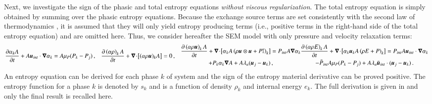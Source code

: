 \documentclass[preprint,10pt]{elsarticle}
\begin{document}
Next, we investigate the sign of the phasic and total entropy equations \emph{without viscous regularization}. The total entropy equation is simply 
obtained by summing over the phasic entropy equations. Because the exchange source terms are set consistently with the second 
law of thermodynamics \cite{BaerNunziato, PassmanNunziato}, it is assumed that they will only yield entropy producing terms (i.e., positive 
terms in the right-hand side of the total entropy equation) and are omitted here. Thus, we consider hereafter the SEM model with only 
pressure and velocity relaxation terms:
\begin{subequations}\label{eq:liq-7-eqn-sect5_no_exchange}
\begin{align}
  \label{eqn:multi-d-7-eqn-liq-vol_no_exchange}
  \frac{\partial \alpha_{k} A}{\partial t} + A\mbold u_{int} \cdot \grad \alpha_{k}
  &= A \mu_P (P_{k} - P_{j}) \,,
\end{align}
\begin{align}
  \label{multi-d-7-equ-liq_no_exchange}
  \frac{\partial \left( \alpha \rho \right)_{k} A}{\partial t}
  + \div \left[ (\alpha \rho \mbold u)_{k} A \right]
  &= 0 \,,
\end{align}
\begin{multline}
  \frac{\partial \left( \alpha \rho \mbold u \right)_{k} A}{\partial t}
  + \div \left[ \alpha_{k} A \left( \rho \mbold u \otimes \mbold u + P \mathbb{I} \right)_{k} \right]
  = P_{int} A \grad \alpha_{k} \\ + P_{k} \alpha_{k} \grad A
  + A \lambda_u (\mbold u_{j} - \mbold u_{k})\,,
\end{multline}
\begin{multline}
  \frac{\partial \left( \alpha \rho E \right)_{k} A}{\partial t}
  + \div \left[ \alpha_{k} \mbold u_{k} A \left( \rho E + P \right)_{k} \right]
  = P_{int} A \mbold u_{int} \cdot \grad \alpha_{k} \\ - \bar{P}_{int} A \mu_P (P_{k} - P_{j})
  + A \lambda_u \bar{\mbold u}_{int} \cdot (\mbold u_{j} - \mbold u_{k}) \,.
\end{multline}
\end{subequations}
%
An entropy equation can be derived for each phase $k$ of system 
%
and the sign of the entropy material derivative can be proved positive. The entropy function for a phase $k$ is denoted by $s_k$ and is a function of 
density $\rho_k$ and internal energy $e_k$. The full derivation is given in  and only the final result is recalled here. 
\end{document}
